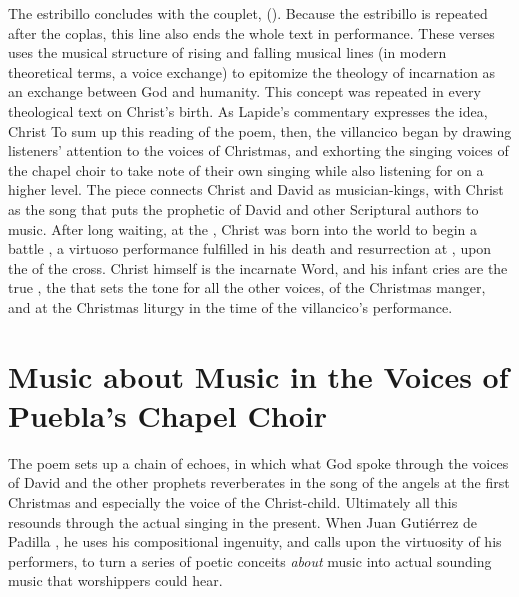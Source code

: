 The estribillo concludes with the couplet,  ().
Because the estribillo is repeated after the coplas, this line also ends the
whole text in performance.
These verses uses the musical structure of rising and falling musical lines (in
modern theoretical terms, a voice exchange) to epitomize the theology of
incarnation as an exchange between God and humanity.
This concept was repeated in every theological text on Christ's birth.
As Lapide's commentary expresses the idea, Christ %
    \Autocite
    [670, on ; the quotation from Anselm is .]
    {Lapide:Gospels19C}
To sum up this reading of the poem, then, the villancico began by drawing
listeners' attention to the voices of Christmas, and exhorting the singing
voices of the chapel choir to take note of their own singing while also
listening for  on a higher level.
The piece connects Christ and David as musician-kings, with Christ as the song
that puts the prophetic  of David and other Scriptural authors to
music.
After long waiting, at the , Christ was born into the
world to begin a battle , a virtuoso performance fulfilled in
his death and resurrection at , upon the 
of the cross.
Christ himself is the incarnate Word, and his infant cries are the true
, the  that sets the tone for all the other
voices,  of the Christmas manger, and at the
Christmas liturgy in the time of the villancico's performance.

\section{Music about Music in the Voices of Puebla's Chapel Choir}

The poem sets up a chain of echoes, in which what God spoke through the voices
of David and the other prophets reverberates in the song of the angels at the
first Christmas and especially the voice of the Christ-child. 
Ultimately all this resounds through the actual  singing in the present.
When Juan Gutiérrez de Padilla , he uses his
compositional ingenuity, and calls upon the virtuosity of his performers, to
turn a series of poetic conceits \emph{about} music into actual sounding music
that worshippers could hear.

